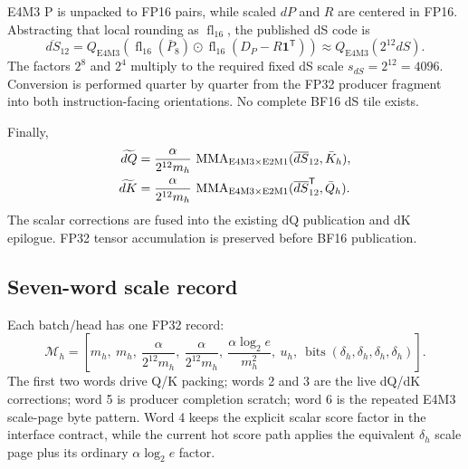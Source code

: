 E4M3 P is unpacked to FP16 pairs, while scaled $dP$ and $R$ are centered in
FP16.  Abstracting that local rounding as $\operatorname{fl}_{16}$, the
published dS code is
\begin{equation}
  \overline{dS}_{12}
  =Q_{\mathrm{E4M3}}\!\left(
    \operatorname{fl}_{16}(\bar P_8)\odot
    \operatorname{fl}_{16}(D_P-R\mathbf1^\mathsf T)
  \right)
  \approx Q_{\mathrm{E4M3}}(2^{12}dS).
  \label{eq:fused-ds}
\end{equation}
The factors $2^8$ and $2^4$ multiply to the required fixed dS scale
$s_{dS}=2^{12}=4096$.  Conversion is performed quarter by quarter from the
FP32 producer fragment into both instruction-facing orientations.  No
complete BF16 dS tile exists.

Finally,
\begin{align}
  \widetilde{dQ}
  &=\frac{\alpha}{2^{12}m_h}\,
    \operatorname{MMA}_{\mathrm{E4M3}\times\mathrm{E2M1}}
    (\overline{dS}_{12},\bar K_h),
    \label{eq:represented-dq}\\
  \widetilde{dK}
  &=\frac{\alpha}{2^{12}m_h}\,
    \operatorname{MMA}_{\mathrm{E4M3}\times\mathrm{E2M1}}
    (\overline{dS}_{12}^{\mathsf T},\bar Q_h).
    \label{eq:represented-dk}
\end{align}
The scalar corrections are fused into the existing dQ publication and dK
epilogue.  FP32 tensor accumulation is preserved before BF16 publication.

\subsection{Seven-word scale record}

Each batch/head has one FP32 record:
\begin{equation}
  \mathcal M_h=
  \left[
  m_h,\ m_h,\
  \frac{\alpha}{2^{12}m_h},\
  \frac{\alpha}{2^{12}m_h},\
  \frac{\alpha\log_2e}{m_h^2},\
  u_h,\
  \operatorname{bits}(\delta_h,\delta_h,\delta_h,\delta_h)
  \right].
  \label{eq:metadata-record}
\end{equation}
The first two words drive Q/K packing; words 2 and 3 are the live dQ/dK
corrections; word 5 is producer completion scratch; word 6 is the repeated
E4M3 scale-page byte pattern.  Word 4 keeps the explicit scalar score factor
in the interface contract, while the current hot score path applies the
equivalent $\delta_h$ scale page plus its ordinary $\alpha\log_2e$ factor.
